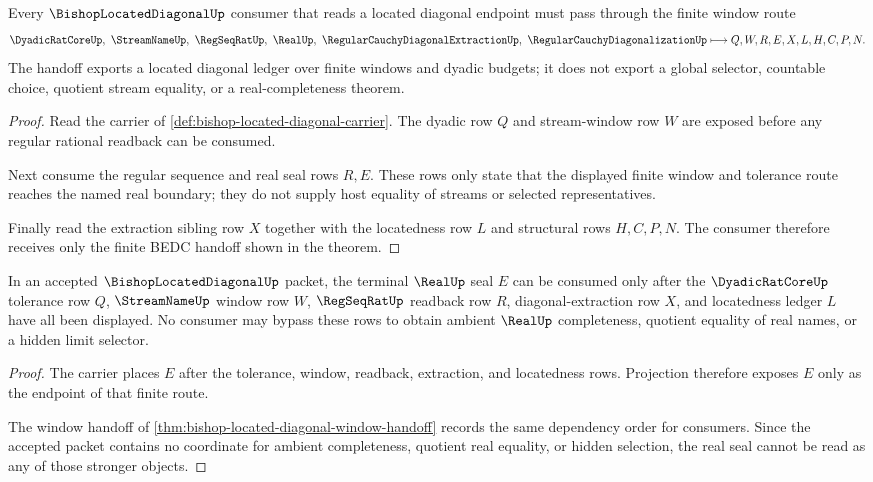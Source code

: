 \begin{theorem}
\label{thm:bishop-located-diagonal-window-handoff}
Every $\BishopLocatedDiagonalUp$ consumer that reads a located diagonal endpoint must pass through the finite window route
$$
\DyadicRatCoreUp,\ \StreamNameUp,\ \RegSeqRatUp,\ \RealUp,\ \RegularCauchyDiagonalExtractionUp,\ \RegularCauchyDiagonalizationUp
\longmapsto
Q,W,R,E,X,L,H,C,P,N .
$$
The handoff exports a located diagonal ledger over finite windows and dyadic budgets; it does not export a global selector, countable choice, quotient stream equality, or a real-completeness theorem.
\end{theorem}
\begin{proof}
Read the carrier of \autoref{def:bishop-located-diagonal-carrier}. The dyadic row $Q$ and stream-window row $W$ are exposed before any regular rational readback can be consumed.

Next consume the regular sequence and real seal rows $R,E$. These rows only state that the displayed finite window and tolerance route reaches the named real boundary; they do not supply host equality of streams or selected representatives.

Finally read the extraction sibling row $X$ together with the locatedness row $L$ and structural rows $H,C,P,N$. The consumer therefore receives only the finite BEDC handoff shown in the theorem.
\end{proof}

\begin{theorem}
\label{thm:bishop-located-diagonal-real-seal-nonescape}
In an accepted $\BishopLocatedDiagonalUp$ packet, the terminal $\RealUp$ seal $E$ can be consumed only after the $\DyadicRatCoreUp$ tolerance row $Q$, $\StreamNameUp$ window row $W$, $\RegSeqRatUp$ readback row $R$, diagonal-extraction row $X$, and locatedness ledger $L$ have all been displayed. No consumer may bypass these rows to obtain ambient $\RealUp$ completeness, quotient equality of real names, or a hidden limit selector.
\end{theorem}
\begin{proof}
The carrier places $E$ after the tolerance, window, readback, extraction, and locatedness rows. Projection therefore exposes $E$ only as the endpoint of that finite route.

The window handoff of \autoref{thm:bishop-located-diagonal-window-handoff} records the same dependency order for consumers. Since the accepted packet contains no coordinate for ambient completeness, quotient real equality, or hidden selection, the real seal cannot be read as any of those stronger objects.
\end{proof}

